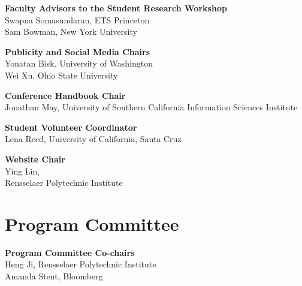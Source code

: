 {\bf Faculty Advisors to the Student Research Workshop} \\
Swapna Somasundaran, ETS Princeton\\
Sam Bowman, New York University

{\bf Publicity and Social Media Chairs} \\
Yonatan Bisk, University of Washington \\
Wei Xu, Ohio State University

{\bf Conference Handbook Chair} \\
Jonathan May, University of Southern California Information Sciences Institute

{\bf Student Volunteer Coordinator} \\
Lena Reed, University of California, Santa Cruz


{\bf Website Chair} \\
Ying Lin, \\Rensselaer Polytechnic Institute



\clearpage
\section{Program Committee}
\setlength{\parindent}{0pt}

\vspace*{0.5cm}

{\bf Program Committee Co-chairs} \\
Heng Ji, Rensselaer Polytechnic Institute\\
Amanda Stent, Bloomberg

